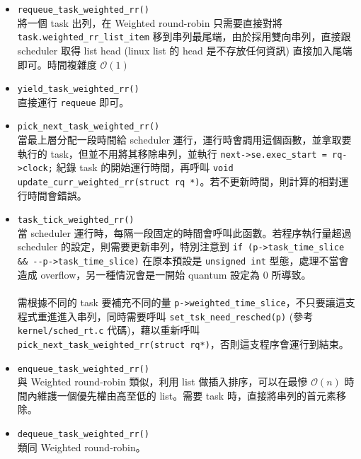\documentclass{res}
\begin{document}
\begin{resume}
\begin{itemize}
	\item
	\lstinline{requeue_task_weighted_rr()} \\
	將一個 task 出列，在 Weighted round-robin 只需要直接對將 \lstinline{task.weighted_rr_list_item} 移到串列最尾端，由於採用雙向串列，直接跟 scheduler 取得 list head (linux list 的 head 是不存放任何資訊) 直接加入尾端即可。時間複雜度 $\mathcal{O}(1)$
	
	\item
	\lstinline{yield_task_weighted_rr()} \\
	直接運行 \lstinline{requeue} 即可。
	
	\item
	\lstinline{pick_next_task_weighted_rr()} \\
	當最上層分配一段時間給 scheduler 運行，運行時會調用這個函數，並拿取要執行的 task，但並不用將其移除串列，並執行  \lstinline{next->se.exec_start = rq->clock;} 紀錄 task 的開始運行時間，再呼叫 \lstinline {void update_curr_weighted_rr(struct rq *)}。若不更新時間，則計算的相對運行時間會錯誤。
	
	\item
	\lstinline{task_tick_weighted_rr()} \\
	當 scheduler 運行時，每隔一段固定的時間會呼叫此函數。若程序執行量超過 scheduler 的設定，則需要更新串列，特別注意到 \lstinline{if (p->task_time_slice && --p->task_time_slice)} 在原本預設是 \lstinline{unsigned int} 型態，處理不當會造成 overflow，另一種情況會是一開始 quantum 設定為 0 所導致。 \\ \\
	需根據不同的 task 要補充不同的量 \lstinline{p->weighted_time_slice}，不只要讓這支程式重進進入串列，同時需要呼叫 \lstinline{set_tsk_need_resched(p)} (參考 \lstinline{kernel/sched_rt.c} 代碼)，藉以重新呼叫 \lstinline{pick_next_task_weighted_rr(struct rq*)}，否則這支程序會運行到結束。
\end{itemize}

\vspace*{.05in} \hspace*{.1in} 

\begin{itemize}
	\item 
	\lstinline{enqueue_task_weighted_rr()} \\
	與 Weighted round-robin 類似，利用 list 做插入排序，可以在最慘 $\mathcal{O}(n)$ 時間內維護一個優先權由高至低的 list。需要 task 時，直接將串列的首元素移除。
	
	\item
	\lstinline{dequeue_task_weighted_rr()} \\
	類同 Weighted round-robin。
	

\end{itemize}
\end{resume}
\end{document}

